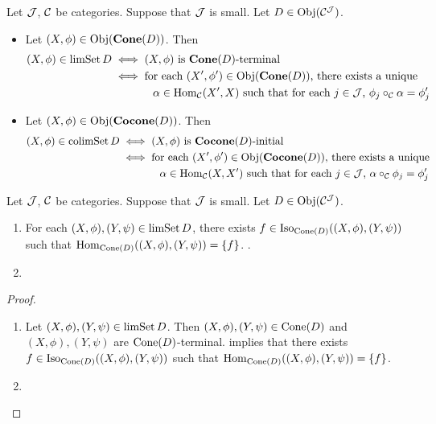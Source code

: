 \documentclass{book}
\begin{document}
	\begin{note}
		Let $\mathcal{J}$, $\mathcal{C}$ be categories. Suppose that $\mathcal{J}$ is small. Let $D \in \operatorname{Obj}(\mathcal{C}^{\mathcal{J}})$. 
		\begin{itemize}
			\item Let $(X, \phi) \in \operatorname{Obj}(\operatorname*{\text{\textbf{Cone}}}(D))$. Then 
			\begin{align*}
				(X, \phi) \in \operatorname{limSet} D
				& \iff \text{$(X, \phi)$ is $\operatorname*{\text{\textbf{Cone}}}(D)$-terminal} \\
				& \iff \text{for each $(X', \phi') \in \operatorname{Obj}(\operatorname*{\text{\textbf{Cone}}}(D))$, there exists a unique} \\
				& \hspace{1.3cm }\text{$\alpha \in \operatorname{Hom}_{\mathcal{C}}(X', X)$ such that for each $j \in \mathcal{J}$, $\phi_j \circ_{\mathcal{C}} \alpha = \phi'_j$}
			\end{align*} 
			\item Let $(X, \phi) \in \operatorname{Obj}(\operatorname*{\text{\textbf{Cocone}}}(D))$. Then 
			\begin{align*}
				(X, \phi) \in \operatorname{colimSet} D
				& \iff \text{$(X, \phi)$ is $\operatorname*{\text{\textbf{Cocone}}}(D)$-initial} \\
				& \iff \text{for each $(X', \phi') \in \operatorname{Obj}(\operatorname*{\text{\textbf{Cocone}}}(D))$, there exists a unique} \\
				& \hspace{1.3cm }\text{$\alpha \in \operatorname{Hom}_{\mathcal{C}}(X, X')$ such that for each $j \in \mathcal{J}$, $\alpha \circ_{\mathcal{C}} \phi_j = \phi'_j $}
			\end{align*} 
		\end{itemize}
	\end{note} 

	\begin{ex} 
		Let $\mathcal{J}$, $\mathcal{C}$ be categories. Suppose that $\mathcal{J}$ is small. Let $D \in \operatorname{Obj}(\mathcal{C}^{\mathcal{J}})$.
		\begin{enumerate}
			\item For each $(X, \phi), (Y, \psi) \in \operatorname{limSet} D$, there exists $f \in \operatorname{Iso}_{\text{Cone}(D)}((X, \phi), (Y, \psi))$ such that $\operatorname{Hom}_{\text{Cone}(D)}((X, \phi), (Y, \psi)) = \{f\}$. . 
			\item {}
		\end{enumerate}
	\end{ex}
	
	\begin{proof}\
		\begin{enumerate}
			\item Let $(X, \phi), (Y, \psi) \in \operatorname{limSet} D$. Then $(X, \phi), (Y, \psi) \in \text{Cone}(D)$ and $(X, \phi), (Y, \psi)$ are $\text{Cone}(D)$-terminal.  implies that there exists $f \in \operatorname{Iso}_{\text{Cone}(D)}((X, \phi), (Y, \psi))$ such that $\operatorname{Hom}_{\text{Cone}(D)}((X, \phi), (Y, \psi)) = \{f\}$. 
			\item \tcr{colimits}
		\end{enumerate}
	\end{proof}
	
\end{document}

